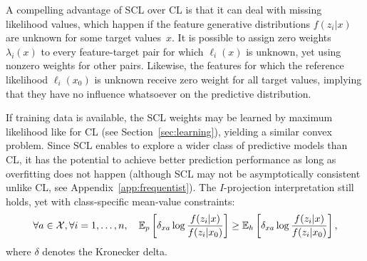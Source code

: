 \documentclass[english]{scrartcl}
\newcommand{\E}{\mathbb{E}}
\begin{document}
A compelling advantage of SCL over CL is that it can deal with missing likelihood values, which happen if the feature generative distributions $f(z_i|x)$ are unknown for some target values~$x$. It is possible to assign zero weights $\lambda_i(x)$ to every feature-target pair for which $\ell_i(x)$ is unknown, yet using nonzero weights for other pairs. Likewise, the features for which the reference likelihood $\ell_i(x_0)$ is unknown receive zero weight for all target values, implying that they have no influence whatsoever on the predictive distribution. 

If training data is available, the SCL weights may be learned by maximum likelihood like for CL (see Section~\ref{sec:learning}), yielding a similar convex problem. Since SCL enables to explore a wider class of predictive models than CL, it has the potential to achieve better prediction performance as long as overfitting does not happen (although SCL may not be asymptotically consistent unlike CL, see Appendix~\ref{app:frequentist}). The $I$-projection interpretation still holds, yet with class-specific mean-value constraints:
$$
\forall a\in{\cal X}, \forall i=1,\ldots,n,
\quad
\E_p\left[\delta_{xa}\log \frac{f(z_i|x)}{f(z_i|x_0)}\right]
\geq \E_h\left[\delta_{xa}\log \frac{f(z_i|x)}{f(z_i|x_0)}\right],
$$
where $\delta$ denotes the Kronecker delta. 







\end{document}
